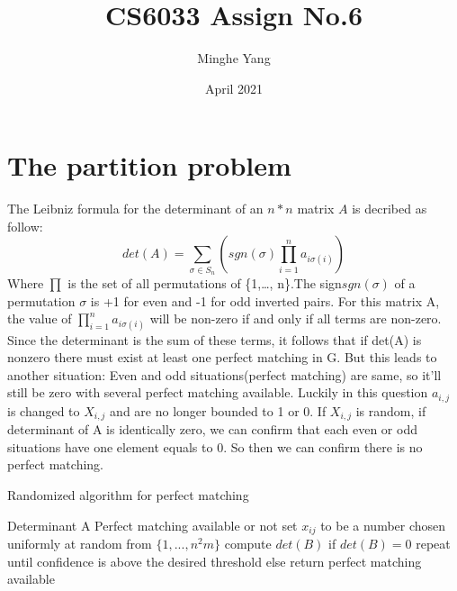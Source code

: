 \documentclass{article}
\title{CS6033 Assign No.6}
\author{Minghe Yang}
\date{April 2021}
\begin{document}
\renewcommand{\algorithmicrequire}{\textbf{Input:}} 
\renewcommand{\algorithmicensure}{\textbf{Output:}}
\maketitle

\section{The partition problem}
The Leibniz formula for the determinant of an $n * n$ matrix $A$ is decribed as follow:
\begin{equation}
    det(A) = \sum_{\sigma \in S_n}(sgn(\sigma)\prod_{i=1}^{n}a_{i\sigma (i)})
\end{equation}
Where $\prod$ is the set of all permutations of \{1,\dots, n\}.The sign$sgn(\sigma)$ of a permutation $\sigma$ is +1 for even and -1 for odd inverted pairs.\newline
For this matrix A, the value of $\prod_{i=1}^{n}a_{i\sigma (i)}$ will be non-zero if and only if all terms are non-zero. Since the determinant is the sum of these terms, it follows that if det(A) is nonzero there must exist at least one perfect matching in G.
But this leads to another situation: Even and odd situations(perfect matching) are same, so it'll still be zero with several perfect matching available.\newline
Luckily in this question $a_{i, j}$ is changed to $X_{i, j}$ and are no longer bounded to 1 or 0. If $X_{i, j}$ is random, if determinant of A is identically zero, we can confirm that each even or odd situations have one element equals to 0. So then we can confirm there is no perfect matching.
\newline{}
\begin{algorithm}
    \caption{Randomized algorithm for perfect matching}
    \begin{algorithmic}[1]
    \Require Determinant A
    \Ensure Perfect matching available or not
    \State set $x_{ij}$ to be a number chosen uniformly at random from $\{1, . . . , n^2m\}$
    \State compute $det(B)$
    \State if $det(B) = 0$ repeat until confidence is above the desired threshold
    \State else return perfect matching available
    \end{algorithmic}
\end{algorithm}
\end{document}
